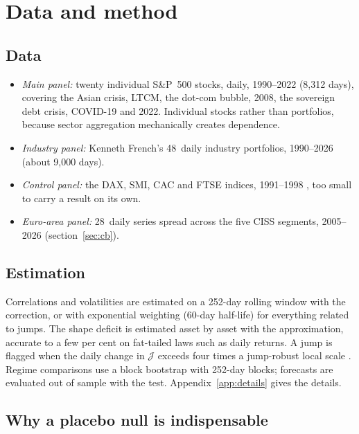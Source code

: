 \documentclass[11pt]{article}
\theoremstyle{definition}
\newcommand{\JJ}{\mathcal{J}}
\begin{document}
\section{Data and method}
\label{sec:methode}

\subsection{Data}

\begin{itemize}
\item \emph{Main panel:} twenty individual S\&P~500 stocks, daily, 1990--2022
(8,312 days), covering the Asian crisis, LTCM, the dot-com bubble, 2008, the
sovereign debt crisis, COVID-19 and 2022. Individual stocks rather than
portfolios, because sector aggregation mechanically creates dependence.
\item \emph{Industry panel:} Kenneth French's 48~daily industry portfolios,
1990--2026 (about 9,000 days).
\item \emph{Control panel:} the DAX, SMI, CAC and FTSE indices, 1991--1998
\citep{bollerslev1996}, too small to carry a result on its own.
\item \emph{Euro-area panel:} 28~daily series spread across the five CISS
segments, 2005--2026 (section~\ref{sec:cb}).
\end{itemize}

\subsection{Estimation}

Correlations and volatilities are estimated on a 252-day rolling window with
the \citet{ledoit2004} correction, or with exponential weighting (60-day
half-life) for everything related to jumps. The shape deficit is estimated
asset by asset with the \citet{hyvarinen1998} approximation, accurate to a few
per cent on fat-tailed laws such as daily returns. A jump is flagged when the
daily change in $\JJ$ exceeds four times a jump-robust local scale
\citep{bns2004}. Regime comparisons use a block bootstrap with 252-day blocks;
forecasts are evaluated out of sample with the \citet{dm1995} test.
Appendix~\ref{app:details} gives the details.

\subsection{Why a placebo null is indispensable}
\label{sec:placebo}
\end{document}
